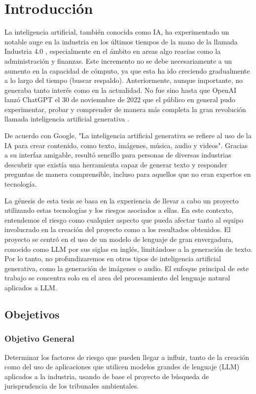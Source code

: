 
\chapter{Introducción}
La inteligencia artificial, también conocida como IA, ha experimentado un notable auge en la industria en los últimos tiempos
de la mano de la llamada Industria 4.0 \cite{intro1}, 
especialmente en el ámbito en areas algo reacias como la administración y finanzas\cite{intro2}. 
Este incremento no se debe necesariamente a un aumento en la capacidad de cómputo, 
ya que esta ha ido creciendo gradualmente a lo largo del tiempo (buscar respaldo). Anteriormente, aunque importante, no generaba tanto 
interés como en la actualidad. No fue sino hasta que OpenAI lanzó ChatGPT el 30 de noviemnbre de 2022 que el público en general 
pudo experimentar, 
probar y comprender de manera más completa la gran revolución llamada inteligencia artificial generativa \cite{intro3}.

De acuerdo con Google, "La inteligencia artificial generativa se refiere al uso de la IA para crear contenido, como texto, imágenes, 
música, audio y videos"\cite{google1}. Gracias a su interfaz amigable, resultó sencillo para personas de diversas industrias descubrir que existía 
una herramienta capaz de generar texto y responder preguntas de manera comprensible, incluso para aquellos que no eran expertos en 
tecnología.

La génesis de esta tesis se basa en la experiencia de llevar a cabo un proyecto utilizando estas tecnologías 
y los riesgos asociados a ellas. En este contexto, entendemos el riesgo como cualquier aspecto que pueda afectar 
tanto al equipo involucrado en la creación del proyecto como a los resultados obtenidos. El proyecto se centró 
en el uso de un modelo de lenguaje de gran envergadura, conocido como LLM por sus siglas en inglés, limitándose a la 
generación de texto. Por lo tanto, no profundizaremos en otros tipos de inteligencia artificial generativa, como la 
generación de imágenes o audio. El enfoque principal de este trabajo se concentra solo
en el area del procesamiento del lenguaje natural aplicados a LLM.


\section{Obejetivos}
\subsection{Objetivo General}
Determinar los factores de riesgo que pueden llegar a influir, tanto de la creación como del uso de aplicaciones que utilicen modelos grandes de lenguaje (LLM) aplicados a la industria, usando de base el proyecto de búsqueda de jurisprudencia de los tribunales ambientales. 
